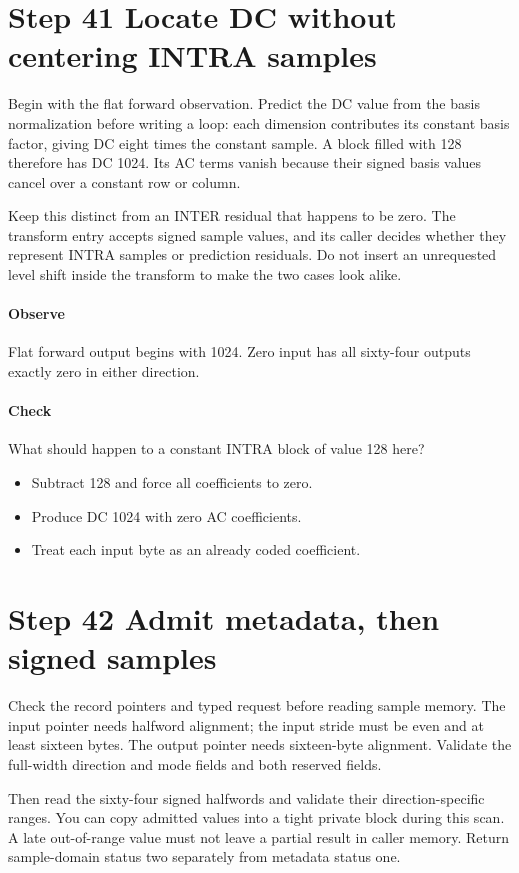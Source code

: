 \section{Step 41 Locate DC without centering INTRA samples}\label{h263-transform-s01}
Begin with the flat forward observation. Predict the DC value from the basis
normalization before writing a loop: each dimension contributes its constant
basis factor, giving DC eight times the constant sample. A block filled with
128 therefore has DC 1024. Its AC terms vanish because their signed basis values
cancel over a constant row or column.

Keep this distinct from an INTER residual that happens to be zero. The transform
entry accepts signed sample values, and its caller decides whether they represent
INTRA samples or prediction residuals. Do not insert an unrequested level shift
inside the transform to make the two cases look alike.

\paragraph{Observe} Flat forward output begins with 1024. Zero input has all
sixty-four outputs exactly zero in either direction.
\paragraph{Check} What should happen to a constant INTRA block of value 128 here?
\begin{itemize}
  \item[A.] Subtract 128 and force all coefficients to zero.
  \item[B.] Produce DC 1024 with zero AC coefficients.
  \item[C.] Treat each input byte as an already coded coefficient.
\end{itemize}

\section{Step 42 Admit metadata, then signed samples}\label{h263-transform-s02}
Check the record pointers and typed request before reading sample memory.
The input pointer needs halfword alignment; the input stride must be even and
at least sixteen bytes. The output pointer needs sixteen-byte alignment.
Validate the full-width direction and mode fields and both reserved fields.

Then read the sixty-four signed halfwords and validate their direction-specific
ranges. You can copy admitted values into a tight private block during this scan.
A late out-of-range value must not leave a partial result in caller memory.
Return sample-domain status two separately from metadata status one.

